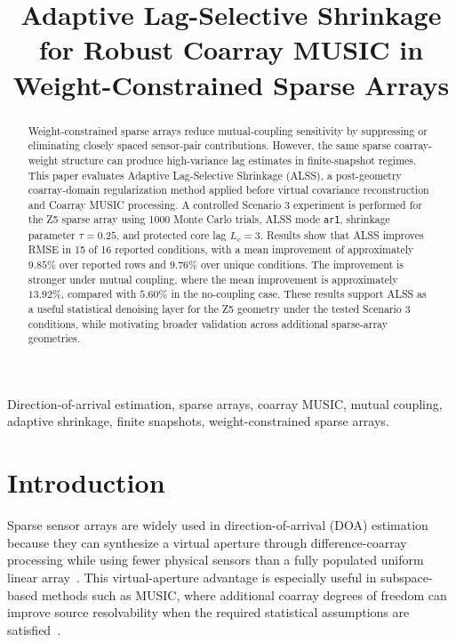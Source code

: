 \documentclass[conference]{IEEEtran}
\title{Adaptive Lag-Selective Shrinkage for Robust Coarray MUSIC in Weight-Constrained Sparse Arrays}
\author{
\IEEEauthorblockN{Hossein Molhem}
\IEEEauthorblockA{
Department of Electrical and Computer Engineering\\
Kennesaw State University\\
Email: hmolhem@students.kennesaw.edu}
}
\begin{document}
\maketitle

\begin{abstract}
Weight-constrained sparse arrays reduce mutual-coupling sensitivity by suppressing or eliminating closely spaced sensor-pair contributions. However, the same sparse coarray-weight structure can produce high-variance lag estimates in finite-snapshot regimes. This paper evaluates Adaptive Lag-Selective Shrinkage (ALSS), a post-geometry coarray-domain regularization method applied before virtual covariance reconstruction and Coarray MUSIC processing. A controlled Scenario 3 experiment is performed for the Z5 sparse array using 1000 Monte Carlo trials, ALSS mode \texttt{ar1}, shrinkage parameter $\tau=0.25$, and protected core lag $L_c=3$. Results show that ALSS improves RMSE in 15 of 16 reported conditions, with a mean improvement of approximately $9.85\%$ over reported rows and $9.76\%$ over unique conditions. The improvement is stronger under mutual coupling, where the mean improvement is approximately $13.92\%$, compared with $5.60\%$ in the no-coupling case. These results support ALSS as a useful statistical denoising layer for the Z5 geometry under the tested Scenario 3 conditions, while motivating broader validation across additional sparse-array geometries.
\end{abstract}

\begin{IEEEkeywords}
Direction-of-arrival estimation, sparse arrays, coarray MUSIC, mutual coupling, adaptive shrinkage, finite snapshots, weight-constrained sparse arrays.
\end{IEEEkeywords}

\section{Introduction}

Sparse sensor arrays are widely used in direction-of-arrival (DOA) estimation because they can synthesize a virtual aperture through difference-coarray processing while using fewer physical sensors than a fully populated uniform linear array~\cite{pal2010nested,vaidyanathan2011coprime,pal2011coprimeMusic}. This virtual-aperture advantage is especially useful in subspace-based methods such as MUSIC, where additional coarray degrees of freedom can improve source resolvability when the required statistical assumptions are satisfied~\cite{schmidt1986music,vantrees2002optimum}.
\end{document}

